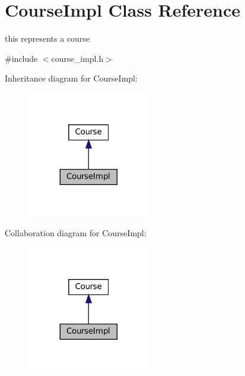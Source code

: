 \hypertarget{classCourseImpl}{}\section{Course\+Impl Class Reference}
\label{classCourseImpl}


this represents a course  




{\ttfamily \#include $<$course\+\_\+impl.\+h$>$}



Inheritance diagram for Course\+Impl\+:
\nopagebreak
\begin{figure}[H]
\begin{center}
\leavevmode
\includegraphics[width=152pt]{classCourseImpl__inherit__graph}
\end{center}
\end{figure}


Collaboration diagram for Course\+Impl\+:
\nopagebreak
\begin{figure}[H]
\begin{center}
\leavevmode
\includegraphics[width=152pt]{classCourseImpl__coll__graph}
\end{center}
\end{figure}
